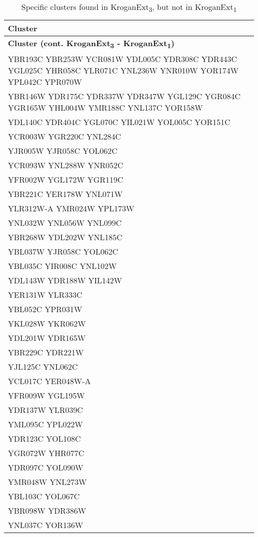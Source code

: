\setlength{\extrarowheight}{2pt}
\renewcommand{\arraystretch}{1.2}
\begin{longtable}{| m{27em} |}
\caption{Specific clusters found in KroganExt\textsubscript{3}, but not in KroganExt\textsubscript{1}} \\
\hline
\textbf{Cluster} \\
\hline
\endfirsthead
\hline
\textbf{Cluster (cont. KroganExt\textsubscript{3} - KroganExt\textsubscript{1})} \\
\hline
\endhead
\hline
\endfoot
\hline
\endlastfoot
YBR193C YBR253W YCR081W YDL005C YDR308C YDR443C YGL025C YHR058C YLR071C YNL236W YNR010W YOR174W YPL042C YPR070W \\
\hline
YBR146W YDR175C YDR337W YDR347W YGL129C YGR084C YGR165W YHL004W YMR188C YNL137C YOR158W \\
\hline
YDL140C YDR404C YGL070C YIL021W YOL005C YOR151C \\
\hline
YCR003W YGR220C YNL284C \\
\hline
YJR005W YJR058C YOL062C \\
\hline
YCR093W YNL288W YNR052C \\
\hline
YFR002W YGL172W YGR119C \\
\hline
YBR221C YER178W YNL071W \\
\hline
YLR312W-A YMR024W YPL173W \\
\hline
YNL032W YNL056W YNL099C \\
\hline
YBR268W YDL202W YNL185C \\
\hline
YBL037W YJR058C YOL062C \\
\hline
YBL035C YIR008C YNL102W \\
\hline
YDL143W YDR188W YIL142W \\
\hline
YER131W YLR333C \\
\hline
YBL052C YPR031W \\
\hline
YKL028W YKR062W \\
\hline
YDL201W YDR165W \\
\hline
YBR229C YDR221W \\
\hline
YJL125C YNL062C \\
\hline
YCL017C YER048W-A \\
\hline
YFR009W YGL195W \\
\hline
YDR137W YLR039C \\
\hline
YML095C YPL022W \\
\hline
YDR123C YOL108C \\
\hline
YGR072W YHR077C \\
\hline
YDR097C YOL090W \\
\hline
YMR048W YNL273W \\
\hline
YBL103C YOL067C \\
\hline
YBR098W YDR386W \\
\hline
YNL037C YOR136W \\
\hline
\end{longtable}
